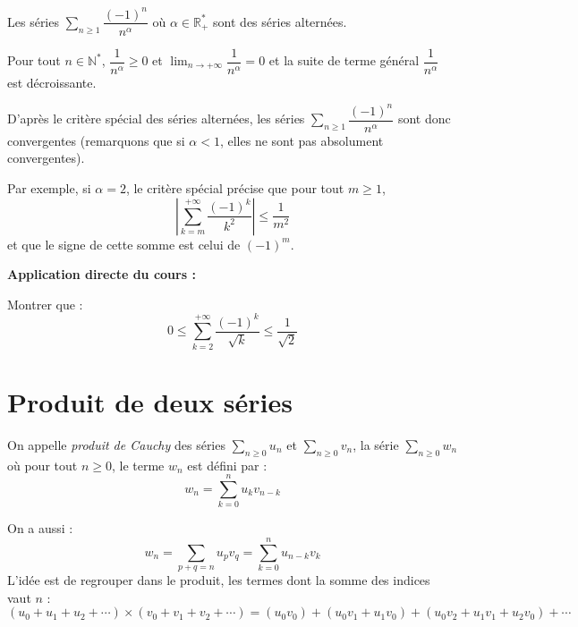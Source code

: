 \documentclass[french,11pt,twoside]{VcCours}
\newenvironment{ApplicationDirecte}{\textbf{Application directe du cours :}

}{}
\newcommand{\Sum}[2]{\ensuremath{\textstyle{\sum\limits_{#1}^{#2}}}}
\begin{document}

\begin{Exemple} Les séries $\Sum{n \geq 1}{} \dfrac{(-1)^n}{n^{\alpha}}$ où $\alpha \in \mathbb{R}_+^{*}$ sont des séries alternées.

Pour tout $n \in \mathbb{N}^*$, $\dfrac{1}{n^{\alpha}} \geq 0$ et $\lim_{n \rightarrow + \infty} \dfrac{1}{n^{\alpha}} = 0$ et la suite de terme général $\dfrac{1}{n^{\alpha}}$ est décroissante. 

D'après le critère spécial des séries alternées, les séries $\Sum{n \geq 1}{} \dfrac{(-1)^n}{n^{\alpha}}$ sont donc convergentes (remarquons que si $\alpha <1$, elles ne sont pas absolument convergentes).

\medskip

Par exemple, si $\alpha = 2$, le critère spécial précise que pour tout $m \geq 1$,
$$ \left\vert \sum_{k=m}^{+ \infty}\dfrac{(-1)^k}{k^{2}}  \right\vert \leq \frac{1}{m^2}$$
et que le signe de cette somme est celui de $(-1)^m$.
\end{Exemple}

\begin{ApplicationDirecte} Montrer que :
$$ 0 \leq \sum_{k=2}^{+ \infty}\dfrac{(-1)^k}{\sqrt{k}} \leq \frac{1}{\sqrt{2}}$$
\end{ApplicationDirecte}


\section{Produit de deux séries}

\begin{Definition}{} On appelle \emph{produit de Cauchy} des séries $\Sum{n \geq 0}{} u_n$ et $\Sum{n \geq 0}{} v_n$, la série $\Sum{n \geq 0}{} w_n$ où pour tout $n \geq 0$, le terme $w_n$ est défini par :
$$w_n = \sum_{k=0}^n u_k v_{n-k}$$
\end{Definition}


\begin{Remarque}{} On a aussi :
$$ w_n = \sum_{p+q=n} u_p v_q =  \sum_{k=0}^n u_{n-k} v_{k}$$
L'idée est de regrouper dans le produit, les termes dont la somme des indices vaut $n$ :
$$ (u_0 + u_1 + u_2 + \cdots) \times (v_0 + v_1 + v_2 + \cdots) = (u_0 v_0) + (u_0 v_1 + u_1 v_0) + (u_0 v_2 + u _1 v_1 + u_2 v_0) + \cdots$$
\end{Remarque}
\end{document}
